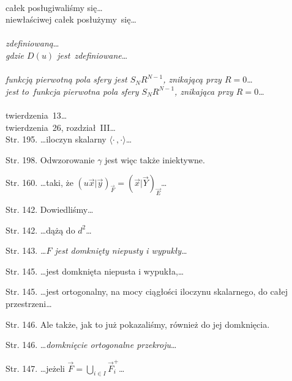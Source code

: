 \documentclass[a4paper,11pt]{article}
\begin{document}
 \\
\Jest całek posługiwaliśmy się\ldots \\
\Powin  niewłaściwej całek posłużymy~się\ldots \\
 \\
\Jest \emph{zdefiniowaną}\ldots \\
\Powin  \emph{gdzie $D( u )$ jest~zdefiniowane}\ldots \\
 \\
\Jest \emph{funkcją pierwotną pola sfery jest $S_{ N } R^{ N - 1 }$,
  znikającą przy $R = 0$}\ldots \\
\Powin \emph{jest to~funkcja pierwotna pola sfery
  $S_{ N } R^{ N - 1 }$,
  znikająca przy $R = 0$}\ldots \\
 \\
\Jest twierdzenia~13\ldots \\
\Powin twierdzenia~26, rozdział~III\ldots \\


















\start Str. 195. \ldots iloczyn skalarny $\langle \cdot \,, \cdot \rangle$\ldots

\start Str. 198. Odwzorowanie $\gamma$ jest więc także iniektywne.

\start Str. 160. \ldots taki, że
$( u\vec{ x } | \vec{ y } )_{ \vec{ F } } = ( \vec{ x } | \vec{ Y }
)_{ \vec{ E } }$\ldots

\start Str. 142. Dowiedliśmy\ldots

\start Str. 142. \ldots dążą do $d^{ 2 }$\ldots

\start Str. 143. \emph{\ldots$F$ jest domknięty niepusty i
  wypukły\ldots}

\start Str. 145. \ldots jest domknięta niepusta i wypukła,\ldots

\start Str. 145. \ldots jest ortogonalny, na mocy ciągłości iloczynu
skalarnego, do całej przestrzeni\ldots

\start Str. 146. Ale także, jak to już pokazaliśmy, również do jej
domknięcia.

\start Str. 146. \ldots\emph{domknięcie ortogonalne przekroju}\ldots

\start Str. 147. \ldots jeżeli
$\vec{ F } = \bigcup_{ i \in I } \vec{ F }_{ i }^{ + }$\ldots
\end{document}
